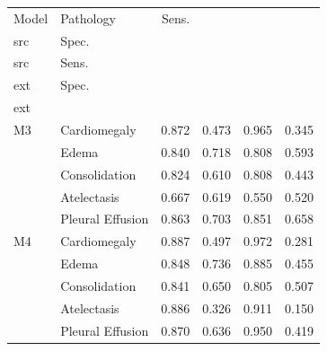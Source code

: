 \begin{tabular}{llrrrr}
\toprule
Model & Pathology & Sens.\\ src & Spec.\\ src & Sens.\\ ext & Spec.\\ ext\\
\midrule
M3 & Cardiomegaly & 0.872 & 0.473 & 0.965 & 0.345\\
 & Edema & 0.840 & 0.718 & 0.808 & 0.593\\
 & Consolidation & 0.824 & 0.610 & 0.808 & 0.443\\
 & Atelectasis & 0.667 & 0.619 & 0.550 & 0.520\\
 & Pleural Effusion & 0.863 & 0.703 & 0.851 & 0.658\\
M4 & Cardiomegaly & 0.887 & 0.497 & 0.972 & 0.281\\
 & Edema & 0.848 & 0.736 & 0.885 & 0.455\\
 & Consolidation & 0.841 & 0.650 & 0.805 & 0.507\\
 & Atelectasis & 0.886 & 0.326 & 0.911 & 0.150\\
 & Pleural Effusion & 0.870 & 0.636 & 0.950 & 0.419\\
\bottomrule
\end{tabular}
